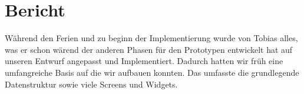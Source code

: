 \chapter{Bericht}
Während den Ferien und zu beginn der Implementierung wurde von Tobias alles,
was er schon wärend der anderen Phasen für den Prototypen entwickelt hat
auf unseren Entwurf angepasst und Implementiert.
Dadurch hatten wir früh eine umfangreiche Basis auf die wir aufbauen konnten.
Das umfasste die grundlegende Datenstruktur sowie viele Screens und Widgets.
